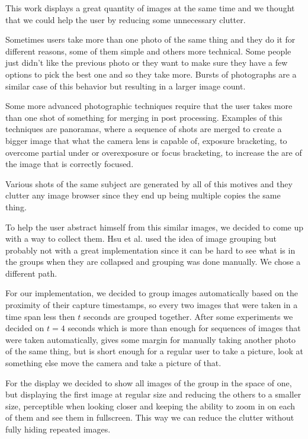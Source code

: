 This work displays a great quantity of images at the same time and we thought that we could help the user by reducing some unnecessary clutter.

Sometimes users take more than one photo of the same thing and they do it for different reasons, some of them simple and others more technical. Some people just didn't like the previous photo or they want to make sure they have a few options to pick the best one and so they take more. Bursts of photographs are a similar case of this behavior but resulting in a larger image count.

Some more advanced photographic techniques require that the user takes more than one shot of something for merging in post processing. Examples of this techniques are panoramas, where a sequence of shots are merged to create a bigger image that what the camera lens is capable of, exposure bracketing, to overcome partial under or overexposure or focus bracketing, to increase the are of the image that is correctly focused.

Various shots of the same subject are generated by all of this motives and they clutter any image browser since they end up being multiple copies the same thing.

To help the user abstract himself from this similar images, we decided to come up with a way to collect them. Hsu et al. \cite{Hsu:2009p2696} used the idea of image grouping but probably not with a great implementation since it can be hard to see what is in the groups when they are collapsed and grouping was done manually. We chose a different path.

For our implementation, we decided to group images automatically based on the proximity of their capture timestamps, so every two images that were taken in a time span less then $t$ seconds are grouped together. After some experiments we decided on $t=4$ seconds which is more than enough for sequences of images that were taken automatically, gives some margin for manually taking another photo of the same thing, but is short enough for a regular user to take a picture, look at something else move the camera and take a picture of that.

For the display we decided to show all images of the group in the space of one, but displaying the first image at regular size and reducing the others to a smaller size, perceptible when looking closer and keeping the ability to zoom in on each of them and see them in fullscreen. This way we can reduce the clutter without fully hiding repeated images.

